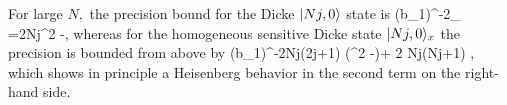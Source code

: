 For large $N,$ the precision bound for the Dicke $\vert{Nj,0}\rangle$ state is
\be
\label{eq:gm-exact precision bound for dicke ih state}
(\Delta b_1)^{-2}_{\max} =2Nj\lpar \sigma^2
-\eta\rpar,
\ee
whereas for the homogeneous sensitive Dicke state $\vert{Nj,0}\rangle_x$ the precision is bounded from above by
\be
(\Delta b_1)^{-2}\leqslant Nj(2j+1) (\sigma^2 -\eta)+ 2 Nj(Nj+1) \eta,
\ee
which shows in principle a Heisenberg behavior in the second term on
the right-hand side.
%
%
%
%
%
%
%
%


